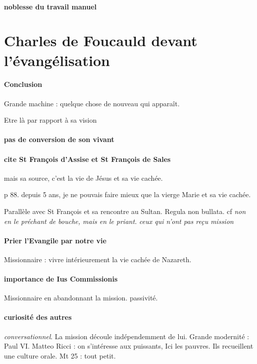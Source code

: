 \paragraph{noblesse du travail manuel}

\section{Charles de Foucauld devant l'évangélisation}


\paragraph{Conclusion}
Grande machine : quelque chose de nouveau qui apparaît. 

Etre là par rapport à sa vision 

\paragraph{pas de conversion de son vivant}

\paragraph{cite St François d'Assise et St François de Sales} mais sa source, c'est la vie de Jésus et sa vie cachée. 

p 88. depuis 5 ans, je ne pouvais faire mieux que la vierge Marie et sa vie cachée.

Parallèle avec St François et sa rencontre au Sultan. Regula non bullata. cf \textit{non en le préchant de bouche, mais en le priant.} \textit{ceux qui n'ont pas reçu mission}

\paragraph{Prier l'Evangile par notre vie}
Missionnaire : vivre intérieurement la vie cachée de Nazareth. 

\paragraph{importance de Ius Commissionis } Missionnaire en abandonnant la mission. passivité. 

\paragraph{curiosité des autres} \textit{conversationnel}. La mission découle indépendemment de lui. Grande modernité : Paul VI. 
Matteo Ricci : on s'intéresse aux puissants, Ici les pauvres.
Ils recueillent une culture orale.  Mt 25 : tout petit. 

